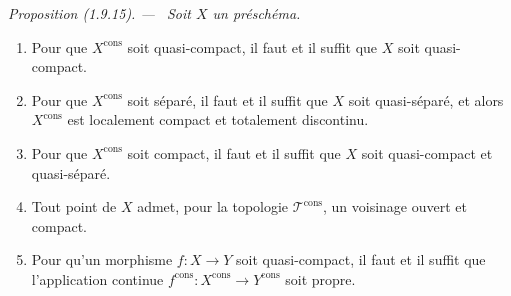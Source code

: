 \documentclass[10pt,oneside]{book}
\makeatletter
\newcommand{\setmanualcurrentlabel}[1]{\def\@currentlabel{#1}}
\newenvironment{proposition}[1][]{%
  \setmanualcurrentlabel{#1}\par\medskip\noindent\itshape Proposition (#1). ---\ }{\par}
\makeatother
\begin{document}
\begin{proposition}[1.9.15]
\label{IV.1.9.15-fr}
Soit $X$ un préschéma.
\begin{enumerate}
  \item[(i)] Pour que $X^{\mathrm{cons}}$ soit quasi-compact, il faut et il
  suffit que $X$ soit quasi-compact.
  \item[(ii)] Pour que $X^{\mathrm{cons}}$ soit séparé, il faut et il suffit
  que $X$ soit quasi-séparé, et alors $X^{\mathrm{cons}}$ est localement
  compact et totalement discontinu.
  \item[(iii)] Pour que $X^{\mathrm{cons}}$ soit compact, il faut et il suffit
  que $X$ soit quasi-compact et quasi-séparé.
  \item[(iv)] Tout point de $X$ admet, pour la topologie
  $\mathscr T^{\mathrm{cons}}$, un voisinage ouvert et compact.
  \item[(v)] Pour qu'un morphisme $f:X\to Y$ soit quasi-compact, il faut et il
  suffit que l'application continue
  $f^{\mathrm{cons}}:X^{\mathrm{cons}}\to Y^{\mathrm{cons}}$ soit propre.
\end{enumerate}
\end{proposition}
\end{document}
